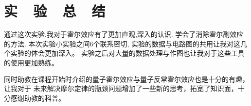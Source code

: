 \documentclass{thuemp}
\begin{document}
\section{实~~验~~总~~结}
通过这次实验,我对于霍尔效应有了更加直观,深入的认识.
学会了消除霍尔副效应的方法.
本次实验小实验之间6个联系密切,
实验的数据与电路图的共用让我对这几个实验的体会更加深入。
实验之后对大量的数据处理与作图也让我对于这些工具的使用更加熟练。

同时助教在课程开始时介绍的量子霍尔效应与量子反常霍尔效应也是十分的有趣，让我对于
未来解决摩尔定律的瓶颈问题增加了一些新的思考，拓宽了知识面，十分感谢助教的科普。

\renewcommand\refname{\heiti\wuhao\centerline{参考文献}\global\def\refname{参考文献}}
\vskip 12pt

\let\OLDthebibliography\thebibliography
\renewcommand\thebibliography[1]{
  \OLDthebibliography{#1}
  \setlength{\parskip}{0pt}
  \setlength{\itemsep}{0pt plus 0.3ex}
}

{
\renewcommand{\baselinestretch}{0.9}
\liuhao


}
\end{document}
